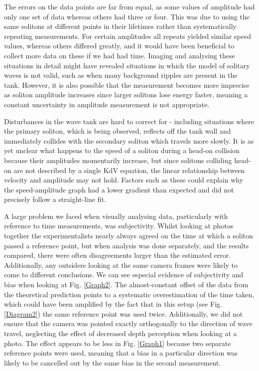 \documentclass[10pt, twocolumn]{revtex4}    %
\begin{document}
The errors on the data points are far from equal, as some values of amplitude had only one set of data whereas others had three or four. This was due to using the same solitons at different points in their lifetimes rather than systematically repeating measurements. For certain amplitudes all repeats yielded similar speed values, whereas others differed greatly, and it would have been beneficial to collect more data on these if we had had time. Imaging and analysing these situations in detail might have revealed situations in which the model of solitary waves is not valid, such as when many background ripples are present in the tank. However, it is also possible that the measurement becomes more imprecise as soliton amplitude increases since larger solitons lose energy faster, meaning a constant uncertainty in amplitude measurement is not appropriate. 

Disturbances in the wave tank are hard to correct for - including situations where the primary soliton, which is being observed, reflects off the tank wall and immediately collides with the secondary soliton which travels more slowly. It is as yet unclear what happens to the speed of a soliton during a head-on collision because their amplitudes momentarily increase, but since solitons colliding head-on are not described by a single KdV equation, the linear relationship between velocity and amplitude may not hold. Factors such as these could explain why the speed-amplitude graph had a lower gradient than expected and did not precisely follow a straight-line fit. 

A large problem we faced when visually analysing data, particularly with reference to time measurements, was subjectivity. Whilst looking at photos together the experimentalists nearly always agreed on the time at which a soliton passed a reference point, but when analysis was done separately, and the results compared, there were often disagreements larger than the estimated error. Additionally, any outsiders looking at the same camera frames were likely to come to different conclusions. We can see especial evidence of subjectivity and bias when looking at Fig. \ref{Graph2}. The almost-constant offset of the data from the theoretical prediction points to a systematic overestimation of the time taken, which could have been amplified by the fact that in this setup (see Fig. \ref{Diagram2}) the same reference point was used twice. Additionally, we did not ensure that the camera was pointed exactly orthogonally to the direction of wave travel, neglecting the effect of decreased depth perception when looking at a photo. The effect appears to be less in Fig. \ref{Graph1} because two separate reference points were used, meaning that a bias in a particular direction was likely to be cancelled out by the same bias in the second measurement. 
\end{document}
